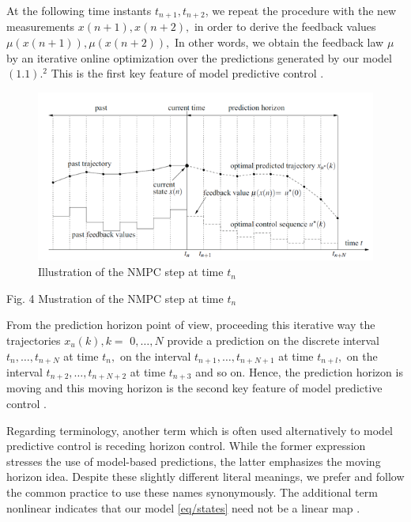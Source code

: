 \documentclass{UoNMCHA}
\numberwithin{equation}{section}
\begin{document}
	
	At the following time instants $t_{n+1}, t_{n+2}$, we repeat the procedure with the new measurements
	$x(n+1), x(n+2),$ in order to derive the feedback values $\mu(x(n+1)), \mu(x(n+2)),$ In other words,
	we obtain the feedback law $\mu$ by an iterative online optimization over the predictions generated by our
	model $(1.1) .^{2}$ This is the first key feature of model predictive control \cite{larsgrune_2017_nonlinear}.
	
	\begin{figure}[H]
		\begin{center}
			\includegraphics[width=1\linewidth]{figs/Picture7}
			\caption{Illustration of the NMPC step at time $ t_n $ \cite{larsgrune_2017_nonlinear}}
			\label{figs/Picture7}
		\end{center}
	\end{figure}
	
	Fig. 4 Mustration of the NMPC step at time $t_{n}$
	
	From the prediction horizon point of view, proceeding this iterative way the trajectories $x_{u}(k), k=$
	$0, \ldots, N$ provide a prediction on the discrete interval $t_{n}, \ldots, t_{n+N}$ at time $t_{n},$ on the interval
	$t_{n+1}, \ldots, t_{n+N+1}$ at time $t_{n+l},$ on the interval $t_{n+2}, \ldots, t_{n+N+2}$ at time $t_{n+3}$ and so on. Hence, the
	prediction horizon is moving and this moving horizon is the second key feature of model predictive
	control \cite{larsgrune_2017_nonlinear}.
	
	Regarding terminology, another term which is often used alternatively to model predictive control is
	receding horizon control. While the former expression stresses the use of model-based predictions, the
	latter emphasizes the moving horizon idea. Despite these slightly different literal meanings, we prefer
	and follow the common practice to use these names synonymously. The additional term nonlinear
	indicates that our model \ref{eq/states} need not be a linear map \cite{larsgrune_2017_nonlinear}.
	
\end{document}
